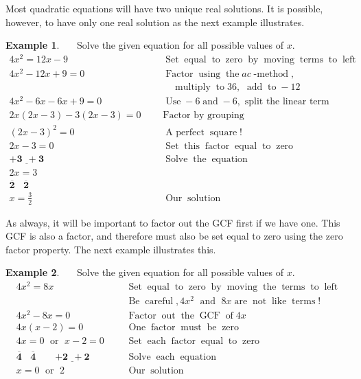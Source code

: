 \documentclass[12pt]{book}
\theoremstyle{definition}
\newtheorem{example}{Example}
\newcommand{\tmmathbf}[1]{\ensuremath{\boldsymbol{#1}}}
\newcommand{\tmop}[1]{\ensuremath{\operatorname{#1}}}
\begin{document}
Most quadratic equations will have two unique real solutions. It is possible, however, to have only one real solution as the next example illustrates.
\begin{example}~~~Solve the given equation for all possible values of $x$.
  \begin{eqnarray*}
    4 x^2 = 12 x - 9~~~ &  & \tmop{Set} \tmop{equal} \tmop{to} \tmop{zero}
    \tmop{by} \tmop{moving} \tmop{terms} \tmop{to} \tmop{left}\\
    4 x^2 - 12 x + 9 = 0~~~ &  & \tmop{Factor} \tmop{using} \tmop{the} ac
    \tmop{-method},\\
		&& \tmop{~~~multiply} \tmop{to} 36, \tmop{~add} \tmop{to} - 12\\
		4 x^2 - 6 x -6x + 9 = 0~~~ &  & \tmop{Use} - 6 \tmop{and} - 6, \text{~split~the~linear~term}\\ 
    2x(2x-3)-3(2x-3)=0~~~ & & \text{Factor~by~grouping}\\
		(2 x - 3)^2 = 0~~~ &  & \tmop{A~perfect} \tmop{square}!\\
    2 x - 3 = 0~~~ &  & \tmop{Set} \tmop{this} \tmop{factor} \tmop{equal}
    \tmop{to} \tmop{zero}\\
    \tmmathbf{\underline{+ 3 ~~+ 3}} &  & \tmop{Solve} \tmop{the} \tmop{equation}\\
    2 x = 3~~~ &  & \\
    \tmmathbf{\overline{2} ~~~~ \overline{2}}~~~ &  & \\
    x = \frac{3}{2}~~~ &  & \tmop{Our} \tmop{solution}
  \end{eqnarray*}
\end{example}
As always, it will be important to factor out the GCF first if we have one. This GCF is also a factor, and therefore must also be set equal to zero using the zero factor property.  The next example illustrates this.
\begin{example}~~~Solve the given equation for all possible values of $x$.
  \begin{eqnarray*}
    4 x^2 = 8 x~~ &  & \tmop{Set} \tmop{equal} \tmop{to} \tmop{zero} \tmop{by}
    \tmop{moving} \tmop{the} \tmop{terms} \tmop{to} \tmop{left}\\
 &  & \tmop{Be} \tmop{careful}, 4x^2 \tmop{~and~} 8x \tmop{are} \tmop{not} \tmop{like}
    \tmop{terms} !\\
    4 x^2 - 8 x = 0~~~ &  & \tmop{Factor} \tmop{out} \tmop{the} \tmop{GCF}
    \tmop{of} 4 x\\
    4 x (x - 2) = 0~~~ &  & \tmop{One} \tmop{factor} \tmop{must} \tmop{be}
    \tmop{zero}\\
    4 x = 0 \tmop{~or~} x - 2 = 0~~~ &  & \tmop{Set} \tmop{each} \tmop{factor}
    \tmop{equal} \tmop{to} \tmop{zero}\\
    \tmmathbf{\overline{4} ~~~~ \overline{4} ~~~~~~~~~ \underline{+ 2 ~~+ 2}} &  & \tmop{Solve}
    \tmop{each} \tmop{equation}\\
    x = 0 \tmop{~or~} 2~~~~~ &  & \tmop{Our} \tmop{solution}
  \end{eqnarray*}
\end{example}
\end{document}
